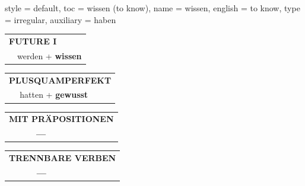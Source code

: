 \begin{verbentry}{
  style = {default},
  toc = {wissen (to know)},
  name = {wissen},
  english = {to know},
  type = {irregular},
  auxiliary = {haben}
}
\begin{tabular}{rl}
    \multicolumn{2}{l}{\textbf{FUTURE I} }\\
  &  werden + \textbf{wissen}\\
 
  \end{tabular}
\hfill
   \begin{tabular}{rl}
      \multicolumn{2}{l}{\textbf{PLUSQUAMPERFEKT}}\\
   & hatten + \textbf{gewusst}\\
  \end{tabular}
  
  \vspace{10pt}



\begin{tabular}{lll}
\multicolumn{3}{l}{\textbf{MIT PRÄPOSITIONEN}}\\
& \textbf{---} & \\
\end{tabular}
\hfill
\begin{tabular}{lll}
\multicolumn{3}{l}{\textbf{TRENNBARE VERBEN}}\\
& \textbf{---} & \\
\end{tabular}

  \vspace{-5pt}
\end{verbentry}


